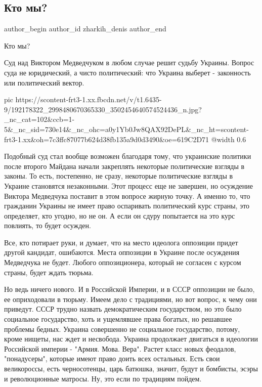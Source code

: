  
 
 
 
 
 
\subsection{Кто мы?}
\label{sec:30_05_2021.fb.zharkih_denis.1.kto_my}
 
\ifcmt
 author_begin
   author_id zharkih_denis
 author_end
\fi

Кто мы? 

Суд над Виктором Медведчуком в любом случае решит судьбу Украины. Вопрос суда
не юридический, а чисто политический: что Украина выберет - законность или
политический вектор. 

\ifcmt
  pic https://scontent-frt3-1.xx.fbcdn.net/v/t1.6435-9/192178322_2998480670365330_3502454640574524436_n.jpg?_nc_cat=102&ccb=1-5&_nc_sid=730e14&_nc_ohc=a0y1Yb0Jw8QAX92DePL&_nc_ht=scontent-frt3-1.xx&oh=7c3ffc87077b624d38fb135a9d0d3490&oe=619C2D71
  @width 0.6
\fi

Подобный суд стал вообще возможен благодаря тому, что украинские политики после
второго Майдана начали закреплять некоторые политические взгляды в законы. То
есть, постепенно, не сразу, некоторые политические взгляды в Украине становятся
незаконными. Этот процесс еще не завершен, но осуждение Виктора Медведчука
поставит в этом вопросе жирную точку. А именно то, что гражданин Украины не
имеет право оспаривать политический курс страны, это определяет, кто угодно, но
не он. А если он сдуру попытается на это курс повлиять, то будет осужден. 

Все, кто потирает руки, и думает, что на место идеолога оппозиции придет другой
кандидат, ошибаются. Места оппозиции в Украине после осуждения Медведчука не
будет. Любого оппозиционера, который не согласен с курсом страны, будет ждать
тюрьма. 

Но ведь ничего нового. И в Российской Империи, и в СССР оппозиции не было, ее
оприходовали в тюрьму. Имеем дело с традициями, но вот вопрос, к чему они
приведут. СССР трудно назвать демократическим государством, но это было
социальное государство, хоть и ущемлявшее права богатых, но решавшее проблемы
бедных. Украина совершенно не социальное государство, потому, кроме нищеты, нас
ждет и несвобода. Украина продолжает двигаться в идеологии Российской империи -
"Армия. Мова. Вера". Растет класс новых феодалов, "понадусеры", которые имеют
право доить всех остальных. Есть свои великороссы, есть черносотенцы, царь
батюшка, значит, будут и бомбисты, эсэры и революционные матросы. Ну, это если
по традициям пойдем. 

